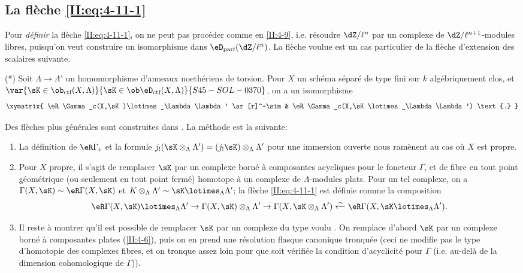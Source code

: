 \subsection{La flèche \texorpdfstring{\eqref{II:eq:4-11-1}}{(4.11.1)}}\label{II:4-12}

Pour \emph{définir} la flèche \eqref{II:eq:4-11-1}, on ne peut pas 
procéder comme en \ref{II:4-9}, i.e. résoudre $\dZ/\ell^n$ par un complexe 
de $\dZ/\ell^{n+1}$-modules libres, puisqu'on veut construire un isomorphisme 
dans $\eD_\text{parf}(\dZ/\ell^n)$. La flèche voulue est un cas particulier de 
la flèche d'extension des scalaires suivante. 

(*) Soit $\Lambda\to\Lambda'$ un homomorphisme d'anneaux noethériens de 
torsion. Pour $X$ un schéma séparé de type fini sur $k$ algébriquement 
clos, et $\var{\sK\in\ob_{\text{ctf}}(X,\Lambda)}{\sK\in\ob\eD_\text{ctf}(X,\Lambda)}{S45-SOL-0370}$, on a un isomorphisme 
\[\xymatrix{
  \eR\Gamma_c(X,\sK)\lotimes_\Lambda \Lambda' \ar[r]^-\sim & \eR \Gamma_c(X,\sK\lotimes_\Lambda \Lambda') \text{.}
}\]

Des flèches plus générales sont construites dans \cite[XVII 4.2.12]{sga4}. La 
m\'
ethode est la suivante: 
\begin{enumerate}[\indent a)]
  \item {}La définition de $\eR\Gamma_c$ et la formule 
    $j_!(\sK\otimes_\Lambda\Lambda') = (j_! \sK)\otimes_\Lambda\Lambda'$ pour une 
    immersion ouverte nous ramènent au cas où $X$ est propre. 
  \item Pour $X$ propre, il s'agit de remplacer $\sK$ par un complexe borné à 
    composantes acycliques pour le foncteur $\Gamma$, et de fibre en tout point 
    géométrique (ou seulement en tout point fermé) homotope à un 
    complexe de $\Lambda$-modules plats. Pour un tel complexe, on a 
    $\Gamma(X,\sK)\sim \eR\Gamma(X,\sK)$ et 
    $K\otimes_\Lambda\Lambda'\sim \sK\lotimes_\Lambda\Lambda'$; la flèche 
    \eqref{II:eq:4-11-1} est définie comme la composition 
    \[
      \eR\Gamma(X,\sK)\lotimes_\Lambda \Lambda' \to \Gamma(X,\sK)\otimes_\Lambda\Lambda' \to \Gamma(X,\sK\otimes_\Lambda\Lambda') \xleftarrow\sim \eR\Gamma(X,\sK\lotimes_\Lambda\Lambda') \text{.}
    \]
  \item Il reste à montrer qu'il est possible de remplacer $\sK$ par un 
    complexe du type voulu \cite[XVII.4.2.10]{sga4}. On remplace d'abord $\sK$ par 
    un complexe borné à composantes plates (\ref{II:4-6}), puis on en prend 
    une résolution flasque canonique tronquée (ceci ne modifie pas le type 
    d'homotopie des complexes fibres, et on tronque assez loin pour que 
    soit vérifiée la condition d'acyclicité pour $\Gamma$ (i.e. au-delà 
    de la dimension cohomologique de $\Gamma$)). 
\end{enumerate}





